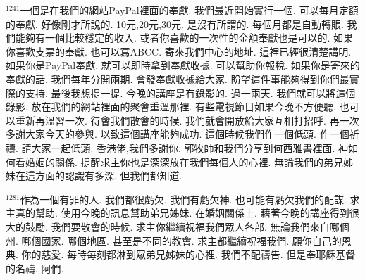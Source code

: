 \documentclass{book}
\begin{document}
$^{1241}$一個是在我們的網站PayPal裡面的奉獻.
我們最近開始實行一個.
可以每月定額的奉獻.
好像剛才所說的.
10元,20元,30元.
是沒有所謂的.
每個月都是自動轉賬.
我們能夠有一個比較穩定的收入.
或者你喜歡的一次性的金額奉獻也是可以的.
如果你喜歡支票的奉獻.
也可以寫ABCC.
寄來我們中心的地址.
這裡已經很清楚講明.
如果你是PayPal奉獻.
就可以即時拿到奉獻收據.
可以幫助你報稅.
如果你是寄來的奉獻的話.
我們每年分開兩期.
會發奉獻收據給大家.
盼望這件事能夠得到你們最實際的支持.
最後我想提一提.
今晚的講座是有錄影的.
過一兩天.
我們就可以將這個錄影.
放在我們的網站裡面的聚會重溫那裡.
有些電視節目如果今晚不方便聽.
也可以重新再溫習一次.
待會我們散會的時候.
我們就會開放給大家互相打招呼.
再一次多謝大家今天的參與.
以致這個講座能夠成功.
這個時候我們作一個低頭.
作一個祈禱.
請大家一起低頭.
香港佬,我們多謝你.
郭牧師和我們分享到何西雅書裡面.
神如何看婚姻的關係.
提醒求主你也是深深放在我們每個人的心裡.
無論我們的弟兄姊妹在這方面的認識有多深.
但我們都知道.

$^{1281}$作為一個有罪的人.
我們都很虧欠.
我們有虧欠神.
也可能有虧欠我們的配謀.
求主真的幫助.
使用今晚的訊息幫助弟兄姊妹.
在婚姻關係上.
藉著今晚的講座得到很大的鼓勵.
我們要散會的時候.
求主你繼續祝福我們眾人各部.
無論我們來自哪個州.
哪個國家.
哪個地區.
甚至是不同的教會.
求主都繼續祝福我們.
願你自己的恩典.
你的慈愛.
每時每刻都淋到眾弟兄姊妹的心裡.
我們不配禱告.
但是奉耶穌基督的名禱.
阿們.
\newpage
\end{document}
